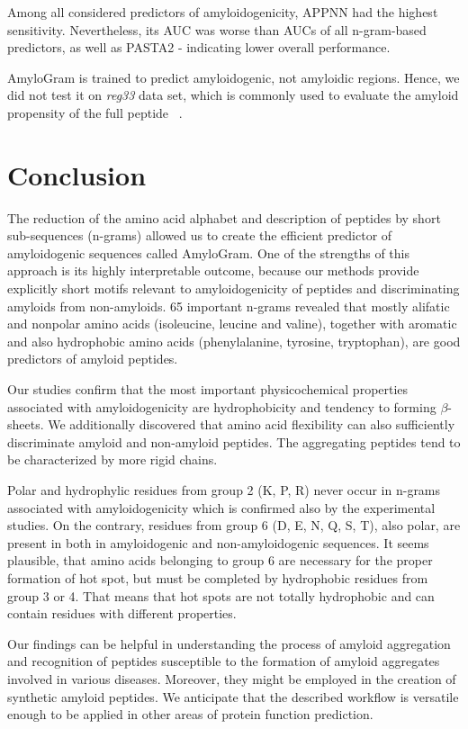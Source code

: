 \documentclass[fleqn,10pt,twoside]{gcb15submission}
\begin{document}
  Among all considered predictors of amyloidogenicity, APPNN had the highest 
sensitivity. Nevertheless, its AUC was worse than AUCs of all n-gram-based 
predictors, as well as PASTA2  - indicating lower overall performance.

  AmyloGram is trained to predict amyloidogenic, not amyloidic regions. Hence, 
we did not test it on \textit{reg33} data set, which is commonly used to 
evaluate the amyloid propensity of the full peptide ~\citep{tsolis_consensus_2013}.

\section{Conclusion}

The reduction of the amino acid alphabet and description of peptides by 
short sub-sequences (n-grams) allowed us to create the efficient predictor 
of amyloidogenic sequences called AmyloGram. One of the strengths of this approach 
is its highly interpretable outcome, because our methods provide explicitly 
short motifs relevant to amyloidogenicity of peptides and discriminating amyloids 
from  non-amyloids. 65 important n-grams revealed that mostly alifatic 
and nonpolar amino acids (isoleucine, leucine and valine), together with aromatic 
and also hydrophobic amino acids (phenylalanine, tyrosine, tryptophan), are good 
predictors of amyloid peptides.

Our studies confirm that the most important physicochemical properties associated 
with amyloidogenicity are hydrophobicity and tendency to forming $\beta$-sheets.  
We additionally discovered that amino acid flexibility can also sufficiently 
discriminate amyloid and non-amyloid peptides. The aggregating peptides tend to
be characterized by more rigid chains. 

Polar and hydrophylic residues from group 2 (K, P, R) never occur in n-grams associated 
with amyloidogenicity which is confirmed also by the experimental studies. On the contrary, 
residues from group 6 (D, E, N, Q, S, T), also polar, are present in both in amyloidogenic 
and non-amyloidogenic sequences. It seems plausible, that amino acids belonging to group 6 
are necessary for the proper formation of hot spot, but must be completed by hydrophobic 
residues from group 3 or 4. That means that hot spots are not totally hydrophobic and can 
contain residues with different properties.

Our findings can be helpful in understanding the process of amyloid aggregation 
and recognition of peptides susceptible to the formation of amyloid aggregates involved 
in various diseases. Moreover, they might be employed in the creation of synthetic 
amyloid peptides. We anticipate that the described workflow is versatile enough to 
be applied in other areas of protein function prediction.
\end{document}
